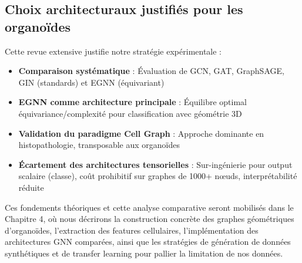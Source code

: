 \subsection*{Choix architecturaux justifiés pour les organoïdes}

Cette revue extensive justifie notre stratégie expérimentale :
\begin{itemize}
    \item \textbf{Comparaison systématique} : Évaluation de GCN, GAT, GraphSAGE, GIN (standards) et EGNN (équivariant)
    \item \textbf{EGNN comme architecture principale} : Équilibre optimal équivariance/complexité pour classification avec géométrie 3D
    \item \textbf{Validation du paradigme Cell Graph} : Approche dominante en histopathologie, transposable aux organoïdes
    \item \textbf{Écartement des architectures tensorielles} : Sur-ingénierie pour output scalaire (classe), coût prohibitif sur graphes de 1000+ nœuds, interprétabilité réduite
\end{itemize}

Ces fondements théoriques et cette analyse comparative seront mobilisés dans le Chapitre 4, où nous décrirons la construction concrète des graphes géométriques d'organoïdes, l'extraction des features cellulaires, l'implémentation des architectures GNN comparées, ainsi que les stratégies de génération de données synthétiques et de transfer learning pour pallier la limitation de nos données.
